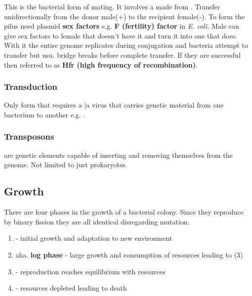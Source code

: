 \documentclass[../Bio_chemistryReview.tex]{subfiles}
\begin{document}
This is the bacterial form of mating. It involves a 
made from . Transfer unidirectionally from the
donor male(+) to the recipient female(-). To form the pilus need plasmid
\textbf{sex factors} e.g. \textbf{F (fertility) factor} in \emph{E. coli.} Male
can give sex factors to female that doesn't have it and turn it into one that
does. With it the entire genome replicates during conjugation and bacteria
attempt to transfer but usu. bridge breaks before complete transfer. If they are
successful then referred to as \textbf{Hfr (high frequency of recombination)}.

\subsubsection{Transduction\supdag}

Only form that requires a |a virus that carries
genetic material from one bacterium to another e.g. .

\subsubsection{Transposons\supdag}

 are genetic elements capable of inserting and removing
themselves from the genome. Not limited to just prokaryotes.

\subsection{Growth\supdag}

There are four phases in the growth of a bacterial colony. Since they reproduce
by binary fission they are all identical disregarding mutation.

\begin{infobox} \begin{enumerate} \item {} - initial growth and
        adaptation to new environment \item {} aka.
        \textbf{log phase} - large growth and consumption of resources leading
      to (3) \item {} - reproduction reaches equilibrium
        with resources \item {} - resources depleted leading to
          death \end{enumerate} \end{infobox}
\end{document}
